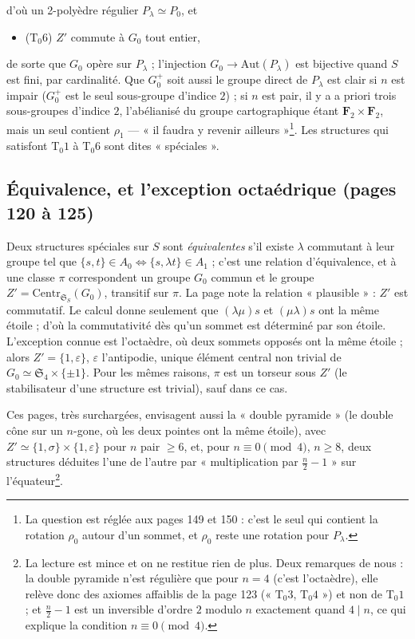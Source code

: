 \documentclass[11pt,a4paper]{article}
\begin{document}
d'où un 2-polyèdre régulier $P_\lambda \simeq P_0$, et
\begin{itemize}
  \item ($\mathrm{T}_0 6$) $Z'$ commute à $G_0$ tout entier,
\end{itemize}
de sorte que $G_0$ opère sur $P_\lambda$ ; l'injection $G_0 \to
\mathrm{Aut}(P_\lambda)$ est bijective quand $S$ est fini, par cardinalité. Que
$G_0^{+}$ soit aussi le groupe direct de $P_\lambda$ est clair si $n$ est
impair ($G_0^{+}$ est le seul sous-groupe d'indice $2$) ; si $n$ est pair, il
y a a priori trois sous-groupes d'indice $2$, l'abélianisé du groupe
cartographique étant $\mathbf{F}_2 \times \mathbf{F}_2$, mais un seul contient
$\rho_1$ --- « il faudra y revenir ailleurs »\footnote{La question est réglée
aux pages 149 et 150 : c'est le seul qui contient la rotation $\rho_0$ autour
d'un sommet, et $\rho_0$ reste une rotation pour $P_\lambda$.}. Les structures
qui satisfont $\mathrm{T}_0 1$ à $\mathrm{T}_0 6$ sont dites « spéciales ».

\subsection*{Équivalence, et l'exception octaédrique (pages 120 à 125)}

Deux structures spéciales sur $S$ sont \emph{équivalentes} s'il existe $\lambda$
commutant à leur groupe tel que $\{s, t\} \in A_0 \iff \{s, \lambda t\} \in
A_1$ ; c'est une relation d'équivalence, et à une classe $\pi$ correspondent un
groupe $G_0$ commun et le groupe $Z' = \mathrm{Centr}_{\mathfrak{S}_S}(G_0)$,
transitif sur $\pi$. La page note la relation « plausible » : $Z'$ est
commutatif. Le calcul donne seulement que $(\lambda\mu)s$ et $(\mu\lambda)s$
ont la même étoile ; d'où la commutativité dès qu'un sommet est déterminé par
son étoile. L'exception connue est l'octaèdre, où deux sommets opposés ont la
même étoile ; alors $Z' = \{1, \varepsilon\}$, $\varepsilon$ l'antipodie,
unique élément central non trivial de $G_0 \simeq \mathfrak{S}_4 \times \{\pm
1\}$. Pour les mêmes raisons, $\pi$ est un torseur sous $Z'$ (le stabilisateur
d'une structure est trivial), sauf dans ce cas.

Ces pages, très surchargées, envisagent aussi la « double pyramide » (le double
cône sur un $n$-gone, où les deux pointes ont la même étoile), avec $Z' \simeq
\{1, \sigma\} \times \{1, \varepsilon\}$ pour $n$ pair $\geq 6$, et, pour $n
\equiv 0 \pmod 4$, $n \geq 8$, deux structures déduites l'une de l'autre par
« multiplication par $\frac{n}{2} - 1$ » sur l'équateur\footnote{La lecture est
mince et on ne restitue rien de plus. Deux remarques de nous : la double
pyramide n'est régulière que pour $n = 4$ (c'est l'octaèdre), elle relève donc
des axiomes affaiblis de la page 123 (« $\mathrm{T}_0 3$, $\mathrm{T}_0 4$ »)
et non de $\mathrm{T}_0 1$ ; et $\frac{n}{2} - 1$ est un inversible d'ordre $2$
modulo $n$ exactement quand $4 \mid n$, ce qui explique la condition
$n \equiv 0 \pmod 4$.}.
\end{document}
